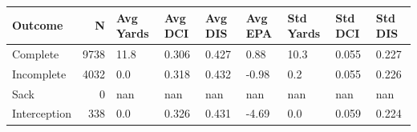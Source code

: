 \begin{tabular}{lrlllllll}
\toprule
Outcome & N & Avg Yards & Avg DCI & Avg DIS & Avg EPA & Std Yards & Std DCI & Std DIS \\
\midrule
Complete & 9738 & 11.8 & 0.306 & 0.427 & 0.88 & 10.3 & 0.055 & 0.227 \\
Incomplete & 4032 & 0.0 & 0.318 & 0.432 & -0.98 & 0.2 & 0.055 & 0.226 \\
Sack & 0 & nan & nan & nan & nan & nan & nan & nan \\
Interception & 338 & 0.0 & 0.326 & 0.431 & -4.69 & 0.0 & 0.059 & 0.224 \\
\bottomrule
\end{tabular}
